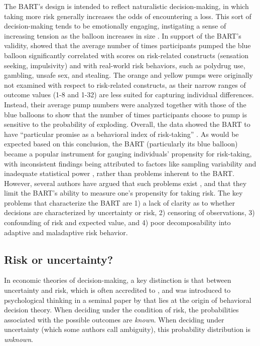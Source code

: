 \documentclass[serif, twocolumn, authordate, meta]{jote-article}
\begin{document}
The BART's design is intended to reflect naturalistic decision-making, in which taking more risk generally increases the odds of encountering a loss. This sort of decision-making tends to be emotionally engaging, instigating a sense of increasing tension as the balloon increases in size \parencite{Schonberg2011}. In support of the BART's validity, \textcite{Lejuez2002} showed that the average number of times participants pumped the blue balloon significantly correlated with scores on risk-related constructs (sensation seeking, impulsivity) and with real-world risk behaviors, such as polydrug use, gambling, unsafe sex, and stealing. The orange and yellow pumps were originally not examined with respect to risk-related constructs, as their narrow ranges of outcome values (1-8 and 1-32) are less suited for capturing individual differences. Instead, their average pump numbers were analyzed together with those of the blue balloons to show that the number of times participants choose to pump is sensitive to the probability of exploding. Overall, the data showed the BART to have ``particular promise as a behavioral index of risk-taking'' \parencite[p. 82]{Lejuez2002}. As would be expected based on this conclusion, the BART (particularly its blue balloon) became a popular instrument for gauging individuals' propensity for risk-taking, with inconsistent findings being attributed to factors like sampling variability and inadequate statistical power \parencite{Lauriola2014}, rather than problems inherent to the BART. However, several authors have argued that such problems exist \parencite{deGroot2018, Gu2018, Schmidt2019, Schonberg2011}, and that they limit the BART's ability to measure one's propensity for taking risk. The key problems that characterize the BART are 1) a lack of clarity as to whether decisions are characterized by uncertainty or risk, 2) censoring of observations, 3) confounding of risk and expected value, and 4) poor decomposability into adaptive and maladaptive risk behavior.

{}
\subsection*{Risk or uncertainty?}
\label{sec:risk}

In economic theories of decision-making, a key distinction is that between uncertainty and risk, which is often accredited to \textcite{Knight1921}, and was introduced to psychological thinking in a seminal paper by \textcite{Edwards1954} that lies at the origin of behavioral decision theory. When deciding under the condition of risk, the probabilities associated with the possible outcomes are \emph{known}. When deciding under uncertainty (which some authors call ambiguity), this probability distribution is \emph{unknown}.
\end{document}
